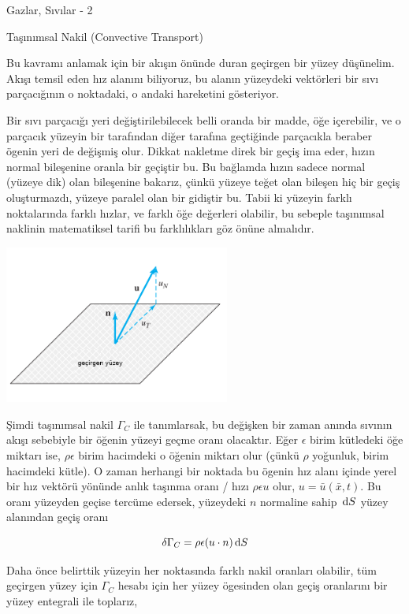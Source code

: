 \documentclass[12pt,fleqn]{article}\usepackage{../../common}
\begin{document}
Gazlar, Sıvılar - 2

Taşınımsal Nakil (Convective Transport)

Bu kavramı anlamak için bir akışın önünde duran geçirgen bir yüzey
düşünelim. Akışı temsil eden hız alanını biliyoruz, bu alanın yüzeydeki
vektörleri bir sıvı parçacığının o noktadaki, o andaki hareketini gösteriyor.

Bir sıvı parçacığı yeri değiştirilebilecek belli oranda bir madde, öğe
içerebilir, ve o parçacık yüzeyin bir tarafından diğer tarafına geçtiğinde
parçacıkla beraber ögenin yeri de değişmiş olur. Dikkat nakletme direk bir
geçiş ima eder, hızın normal bileşenine oranla bir geçiştir bu. Bu bağlamda
hızın sadece normal (yüzeye dik) olan bileşenine bakarız, çünkü yüzeye
teğet olan bileşen hiç bir geçiş oluşturmazdı, yüzeye paralel olan bir
gidiştir bu. Tabii ki yüzeyin farklı noktalarında farklı hızlar, ve farklı
öğe değerleri olabilir, bu sebeple taşınımsal naklinin matematiksel
tarifi bu farklılıkları göz önüne almalıdır. 

\includegraphics[width=20em]{phy_030_fluid2_04.png}

Şimdi taşınımsal nakil $\Gamma_C$ ile tanımlarsak, bu değişken bir zaman anında
sıvının akışı sebebiyle bir öğenin yüzeyi geçme oranı olacaktır. Eğer $\epsilon$
birim kütledeki öğe miktarı ise, $\rho \epsilon$ birim hacimdeki o öğenin
miktarı olur (çünkü $\rho$ yoğunluk, birim hacimdeki kütle). O zaman herhangi
bir noktada bu ögenin hız alanı içinde yerel bir hız vektörü yönünde anlık
taşınma oranı / hızı $\rho \epsilon u$ olur, $u = \bar{u}(\bar{x},t)$. Bu
oranı yüzeyden geçise tercüme edersek, yüzeydeki $n$ normaline sahip $\,\mathrm{d} S$
yüzey alanından geçiş oranı

$$
\delta \Gamma_C = \rho \epsilon (u \cdot n) \,\mathrm{d} S
$$

Daha önce belirttik yüzeyin her noktasında farklı nakil oranları olabilir,
tüm geçirgen yüzey için $\Gamma_C$ hesabı için her yüzey ögesinden olan geçiş
oranlarını bir yüzey entegrali ile toplarız,
\end{document}
